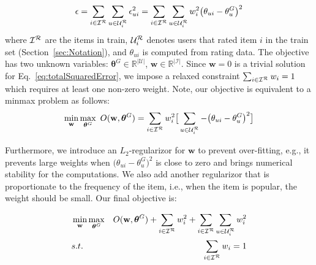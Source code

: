 \begin{align}
\small
\epsilon = \sum_{i \in  \mathcal{I}^{\mathcal{R}}} \sum_{u \in \mathcal{U}_{i}^{\mathcal{R}}}  \epsilon_{ui}^2  =  \sum_{i \in  \mathcal{I}^{\mathcal{R}}} \sum_{u \in \mathcal{U}_{i}^{\mathcal{R}}} w_i^2 \big( \theta_{ui} -  \theta_{u}^G \big)^2
\label{eq:totalSquaredError}
\end{align}
where  $ \mathcal{I}^{\mathcal{R}}$ are the items in train, $\mathcal{U}_{i}^{\mathcal{R}}$  denotes users that rated item $i$ in the train set (Section~\ref{sec:Notation}), and $\theta_{ui}$ is computed from rating data. The objective has two unknown variables: $\bm{\theta}^G \in \mathbb{R}^{|\mathcal{U}|}$, $\mathbf{w} \in \mathbb{R}^{|\mathcal{I}|}$.  Since $\mathbf{w}=0$ is a trivial solution for Eq.~\ref{eq:totalSquaredError}, we impose a relaxed constraint $\sum_{i \in \mathcal{I}^{\mathcal{R}} } w_i=1$ which requires at least one  non-zero weight. Note, our objective is equivalent to a minmax problem as follows:
\begin{align}
\min_{\mathbf{w}} \max_{\bm{\theta}^G}\ O(\mathbf{w},\bm{\theta}^G)= \sum_{i \in  \mathcal{I}^{\mathcal{R}} } w_i^2 \big[ \sum_{u \in \mathcal{U}_{i}^{\mathcal{R}}}  - \big( \theta_{ui} -\theta_u^G\big)^2 \big] 
\label{eq:thetaStarOpt}
\end{align}

Furthermore, we introduce an $L_2$-regularizor for $\mathbf{w}$ to prevent over-fitting, e.g., it prevents large weights when $\big( \theta_{ui} -\theta_u^G\big)^2$ is close to zero and  brings numerical stability for the computations. 
We also add another regularizor that is proportionate to the frequency of the item, i.e., when the item  is popular, the weight should be small.   Our final objective is: 

\begin{align}
&\min_{\mathbf{w}} \max_{\bm{\theta}^G} &  O(\mathbf{w},\bm{\theta}^G)  + \sum_{i \in \mathcal{I}^{\mathcal{R}} } w_i ^2 + \sum_{i \in \mathcal{I}^{\mathcal{R}} }\sum_{u \in \mathcal{U}_{i}^{\mathcal{R}}} w_i^2 & \nonumber \\ 
&s.t. &\sum_{i \in \mathcal{I}^{\mathcal{R}} } w_i=1 &
\label{eq:thetaStarOpt}
\end{align}

